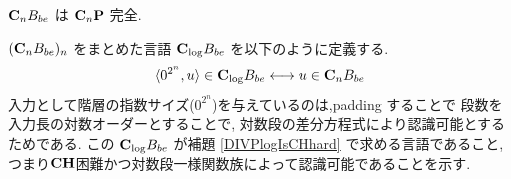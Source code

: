 \begin{lemma} \label{lemma:CnP-complete}
 $\mathbf{C}_n B_{be}$ は $\mathbf{C}_n\mathbf{P}$ 完全.
\end{lemma}


$(\mathbf{C}_n B_{be})_n$ をまとめた言語 $\mathbf{C}_{\log} B_{be}$ を以下のように定義する.
\begin{equation}
 \langle 0^{2^n}, u \rangle \in \mathbf{C}_{\log} B_{be}
 \longleftrightarrow
 u \in \mathbf{C}_n B_{be}
\end{equation}
入力として階層の指数サイズ($0^{2^n}$)を与えているのは,padding することで
段数を入力長の対数オーダーとすることで, 対数段の差分方程式により認識可能とするためである.
この $\mathbf{C}_{\log} B_{be}$ が補題 \ref{DIVPlogIsCHhard} で求める言語であること,
つまり$\mathbf{CH}$困難かつ対数段一様関数族によって認識可能であることを示す.


